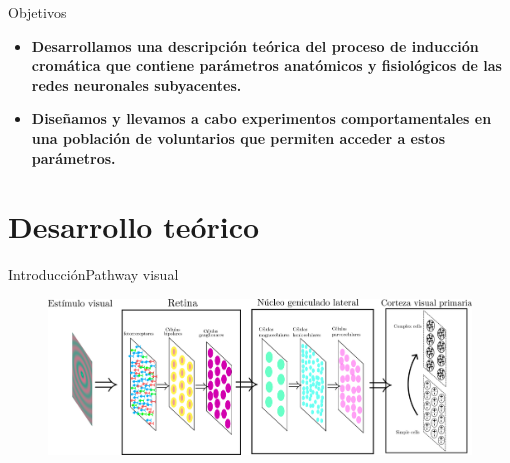 \documentclass[
    11pt, %
    aspectratio=169, %
]{beamer}
\begin{document}


\begin{frame}{Objetivos}
    \begin{itemize}
        \item<1-> \textbf{Desarrollamos una descripción teórica del proceso de inducción cromática que contiene parámetros anatómicos y fisiológicos de las redes neuronales subyacentes.}
        \item<2-> \textbf{Diseñamos y llevamos a cabo experimentos comportamentales en una población de voluntarios que permiten acceder a estos parámetros.}
    \end{itemize}
\end{frame}





\section{Desarrollo teórico}



\begin{frame}{Introducción}{Pathway visual}

          \begin{figure}[h!]
            \centering
            \includegraphics[angle=0, width=13cm]{Images/intro/esquema_visual_pathaway_horizontal.pdf}
         \end{figure}
	
\end{frame}
\end{document}
